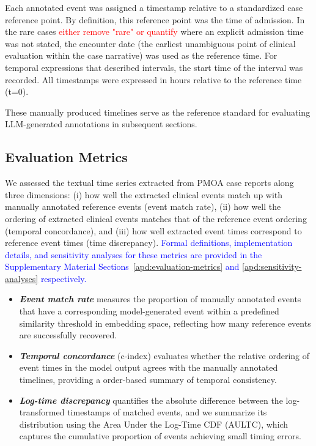 \documentclass[pdflatex,sn-mathphys-num]{sn-jnl}%
\newcommand{\jeremy}[1]{\textcolor{red}{#1}}
\theoremstyle{thmstyleone}%
\theoremstyle{thmstyletwo}%
\theoremstyle{thmstylethree}%
\begin{document}
Each annotated event was assigned a timestamp relative to a standardized case reference point. By definition, this reference point was the time of admission. In the rare cases \jeremy{either remove "rare" or quantify} where an explicit admission time was not stated, the encounter date (the earliest unambiguous point of clinical evaluation within the case narrative) was used as the reference time. For temporal expressions that described intervals, the start time of the interval was recorded. All timestamps were expressed in hours relative to the reference time (t=0).

These manually produced timelines serve as the reference standard for evaluating LLM-generated annotations in subsequent sections.

\subsection{Evaluation Metrics}
\label{sec:evaluation-metrics}

We assessed the textual time series extracted from PMOA case reports along three dimensions: (i) how well the extracted clinical events match up with manually annotated reference events (event match rate), (ii) how well the ordering of extracted clinical events matches that of the reference event ordering (temporal concordance), and (iii) how well extracted event times correspond to reference event times (time discrepancy). \textcolor{blue}{Formal definitions, implementation details, and sensitivity analyses for these metrics are provided in the Supplementary Material Sections~\ref{apd:evaluation-metrics} and \ref{apd:sensitivity-analyses} respectively.}

\begin{itemize}
    \item \textbf{\emph{Event match rate}} measures the proportion of manually annotated events that have a corresponding model-generated event within a predefined similarity threshold in embedding space, reflecting how many reference events are successfully recovered.
    \item \textbf{\emph{Temporal concordance}} (c-index) evaluates whether the relative ordering of event times in the model output agrees with the manually annotated timelines, providing a order-based summary of temporal consistency.
    \item \textbf{\emph{Log-time discrepancy}} quantifies the absolute difference between the log-transformed timestamps of matched events, and we summarize its distribution using the Area Under the Log-Time CDF (AULTC), which captures the cumulative proportion of events achieving small timing errors.  
\end{itemize}
\end{document}
